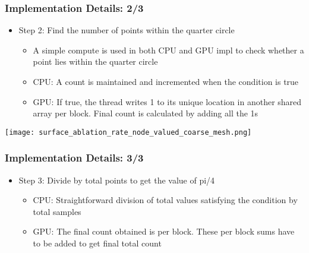 \documentclass[mathserif]{beamer}
\begin{document}
\begin{frame}                                                                                                                                                                          
\frametitle{Implementation Details: 2/3}
\begin{itemize}
\item Step 2: Find the number of points within the quarter circle
\begin{itemize}
\item A simple compute is used in both CPU and GPU impl to check whether a point lies within the quarter circle 
\item CPU: A count is maintained and incremented when the condition is true
\item GPU: If true, the thread writes 1 to its unique location in another shared array per block. Final count is calculated by adding all the 1s 
\end{itemize}
\end{itemize}
\begin{center}
\texttt{[image: surface\_ablation\_rate\_node\_valued\_coarse\_mesh.png]}
\end{center}
\end{frame}              

\begin{frame}                                                                                                                                                                          
\frametitle{Implementation Details: 3/3}
\begin{itemize}
\item Step 3: Divide by total points to get the value of pi/4
\begin{itemize}
\item CPU: Straightforward division of total values satisfying the condition by total samples 
\item GPU: The final count obtained is per block. These per block sums have to be added to get final total count 
\end{itemize}
\end{itemize}
\end{frame}              
 
\end{document}
